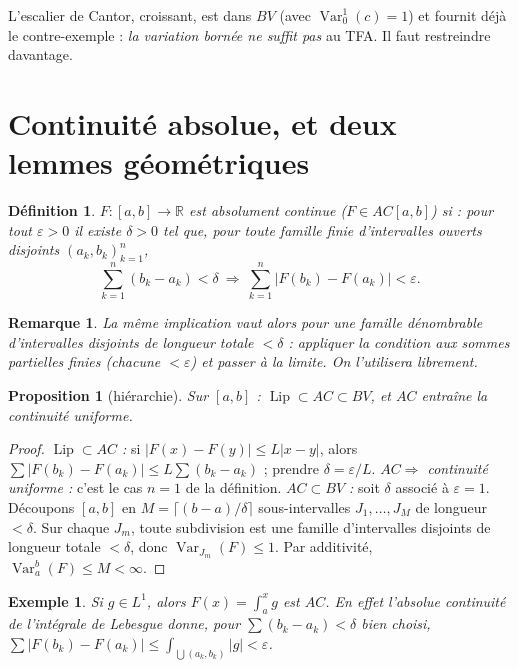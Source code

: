 \documentclass[11pt]{article}
\theoremstyle{thmblue}
\newtheorem{proposition}[theoreme]{Proposition}
\theoremstyle{defplain}
\newtheorem{definition}[theoreme]{Définition}
\newtheorem{exemple}[theoreme]{Exemple}
\theoremstyle{rem}
\newtheorem{remarque}[theoreme]{Remarque}
\newcommand{\R}{\mathbb{R}}
\newcommand{\Var}{\operatorname{Var}}
\DeclareMathOperator{\Lip}{Lip}
\newcommand{\abs}[1]{\left\lvert #1 \right\rvert}
\newcommand{\eps}{\varepsilon}
\begin{document}
L'escalier de Cantor, croissant, est dans $BV$ (avec $\Var_0^1(c)=1$) et fournit déjà le
contre-exemple : \emph{la variation bornée ne suffit pas} au TFA. Il faut restreindre davantage.

\section{Continuité absolue, et deux lemmes géométriques}

\begin{definition}\label{def:ac}
$F:[a,b]\to\R$ est \emph{absolument continue} ($F\in AC[a,b]$) si : pour tout $\eps>0$ il existe
$\delta>0$ tel que, pour toute famille finie d'intervalles ouverts disjoints $(a_k,b_k)_{k=1}^n$,
\[
\sum_{k=1}^n(b_k-a_k)<\delta\ \Longrightarrow\ \sum_{k=1}^n\abs{F(b_k)-F(a_k)}<\eps.
\]
\end{definition}

\begin{remarque}
La même implication vaut alors pour une famille \emph{dénombrable} d'intervalles disjoints de longueur
totale $<\delta$ : appliquer la condition aux sommes partielles finies (chacune $<\eps$) et passer à
la limite. On l'utilisera librement.
\end{remarque}

\begin{proposition}[hiérarchie]\label{prop:hier}
Sur $[a,b]$ : $\Lip\subset AC\subset BV$, et $AC$ entraîne la continuité uniforme.
\end{proposition}

\begin{proof}
\emph{$\Lip\subset AC$ :} si $\abs{F(x)-F(y)}\le L\abs{x-y}$, alors
$\sum\abs{F(b_k)-F(a_k)}\le L\sum(b_k-a_k)$ ; prendre $\delta=\eps/L$.
\emph{$AC\Rightarrow$ continuité uniforme :} c'est le cas $n=1$ de la définition.
\emph{$AC\subset BV$ :} soit $\delta$ associé à $\eps=1$. Découpons $[a,b]$ en $M=\lceil(b-a)/\delta\rceil$
sous-intervalles $J_1,\dots,J_M$ de longueur $<\delta$. Sur chaque $J_m$, toute subdivision est une
famille d'intervalles disjoints de longueur totale $<\delta$, donc $\Var_{J_m}(F)\le1$. Par additivité,
$\Var_a^b(F)\le M<\infty$.
\end{proof}

\begin{exemple}\label{ex:integrale-ac}
Si $g\in L^1$, alors $F(x)=\int_a^x g$ est $AC$. En effet l'absolue continuité de l'intégrale de
Lebesgue donne, pour $\sum(b_k-a_k)<\delta$ bien choisi,
$\sum\abs{F(b_k)-F(a_k)}\le\int_{\bigcup(a_k,b_k)}\abs g<\eps$.
\end{exemple}
\end{document}

